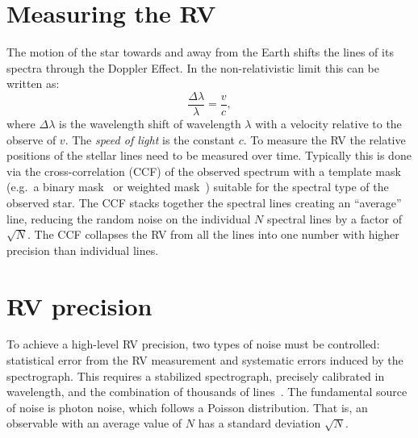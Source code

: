 
\section{Measuring the {RV}}
\label{sec:measuring_rv}
The motion of the star towards and away from the Earth shifts the lines of its spectra through the Doppler Effect.
In the non-relativistic limit this can be written as:
\begin{equation}
\frac{\Delta\lambda}{\lambda} = \frac{v}{c},
\end{equation}
where $\Delta\lambda$ is the wavelength shift of wavelength $\lambda$ with a velocity relative to the observe of \(v\).
The \emph{speed of light} is the constant $c$.
To measure the {RV} the relative positions of the stellar lines need to be measured over time.
Typically this is done via the cross-correlation ({CCF}) of the observed spectrum with a template mask (e.g.\ a binary mask~\citep{baranne_elodie_1996} or weighted mask~\citep{pepe_coralie_2002}) suitable for the spectral type of the observed star.
The {CCF} stacks together the spectral lines creating an ``average'' line, reducing the random noise on the individual $N$ spectral lines by a factor of $\sqrt{N}$.
The {CCF} collapses the {RV} from all the lines into one number with higher precision than individual lines.


\section{{RV} precision}
\label{section:rv_precision}
To achieve a high-level {RV} precision, two types of noise must be controlled: statistical error from the {RV} measurement and systematic errors induced by the spectrograph.
This requires a stabilized spectrograph, precisely calibrated in wavelength, and the combination of thousands of lines~\citep[e.g.][]{pepe_instrumentation_2014}.
The fundamental source of noise is photon noise, which follows a {Poisson} distribution.
That is, an observable with an average value of $N$ has a standard deviation $\sqrt{N}$.

